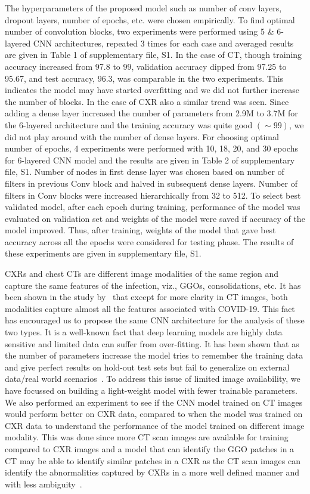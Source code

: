 \documentclass[10pt,journal,compsoc]{IEEEtran}
\begin{document}
The hyperparameters of the proposed model such as number of conv layers, dropout layers, number of epochs, etc. were chosen empirically. To find optimal number of convolution blocks, two experiments were performed using 5 \& 6-layered CNN architectures, repeated 3 times for each case and averaged results are given in Table 1 of supplementary file, S1. In the case of CT, though training accuracy increased from 97.8 to 99, validation accuracy dipped from 97.25 to 95.67, and test accuracy, 96.3, was comparable in the two experiments. This indicates the model may have started overfitting and we did not further increase the number of blocks. In the case of CXR also a similar trend was seen. Since adding a dense layer increased the number of parameters from 2.9M to 3.7M for the 6-layered architecture and the training accuracy was quite good \begin{math}(\sim 99)\end{math}, we did not play around with the number of dense layers. For choosing optimal number of epochs, 4 experiments were performed with 10, 18, 20, and 30 epochs for 6-layered CNN model and the results are given in Table 2 of supplementary file, S1. Number of nodes in first dense layer was chosen based on number of filters in previous Conv block and halved in subsequent dense layers. Number of filters in Conv blocks were increased hierarchically from 32 to 512. To select best validated model, after each epoch during training, performance of the model was evaluated on validation set and weights of the model were saved if accuracy of the model improved. Thus, after training, weights of the model that gave best accuracy across all the epochs were considered for testing phase. The results of these experiments are given in supplementary file, S1. 

CXRs and chest CTs are different image modalities of the same region and capture the same features of the infection, viz., GGOs, consolidations, etc.  It has been shown in the study by~\cite{yoon2020chest} that except for more clarity in CT images, both modalities capture almost all the features associated with COVID-19. This fact has encouraged us to propose the same CNN architecture for the analysis of these two types. It is a well-known fact that deep learning models are highly data sensitive and limited data can suffer from over-fitting. It has been shown that as the number of parameters increase the model tries to remember the training data and give perfect results on hold-out test sets but fail to generalize on external data/real world scenarios~\cite{nguyen2021deep}. To address this issue of limited image availability, we have focussed on building a light-weight model with fewer trainable parameters. We also performed an experiment to see if the CNN model trained on CT images would perform better on CXR data, compared to when the model was trained on CXR data to understand the performance of the model trained on different image modality. This was done since more CT scan images are available for training compared to CXR images and a model that can identify the GGO patches in a CT may be able to identify similar patches in a CXR as the CT scan images can identify the abnormalities captured by CXRs in a more well defined manner and with less ambiguity~\cite{yoon2020chest}.
\end{document}
